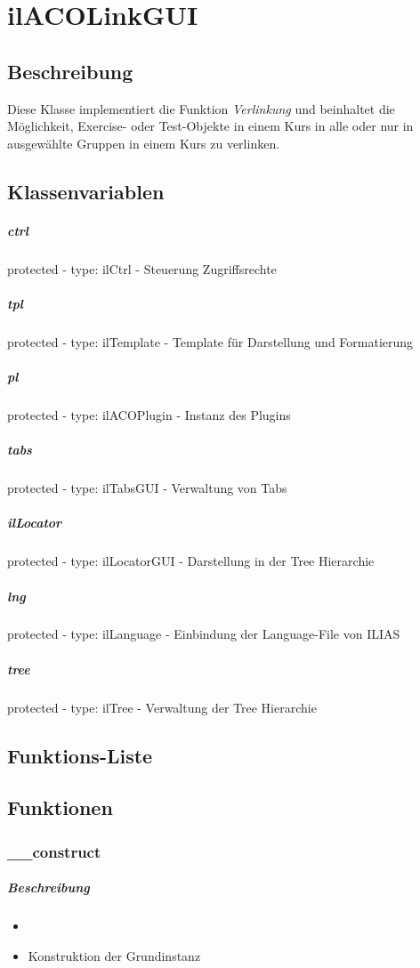 \section{ilACOLinkGUI}

\subsection*{Beschreibung}
Diese Klasse implementiert die Funktion \textit{Verlinkung} und beinhaltet die Möglichkeit, Exercise- oder Test-Objekte in einem Kurs in alle oder nur in ausgewählte Gruppen in einem Kurs zu verlinken.

\subsection*{Klassenvariablen}
\subparagraph{ctrl}
protected - type: ilCtrl - Steuerung Zugriffsrechte
\subparagraph{tpl}
protected - type: ilTemplate - Template für Darstellung und Formatierung
\subparagraph{pl}
protected - type: ilACOPlugin - Instanz des Plugins
\subparagraph{tabs}
protected - type: ilTabsGUI - Verwaltung von Tabs
\subparagraph{ilLocator}
protected - type: ilLocatorGUI - Darstellung in der Tree Hierarchie
\subparagraph{lng}
protected - type: ilLanguage - Einbindung der Language-File von ILIAS
\subparagraph{tree}
protected - type: ilTree - Verwaltung der Tree Hierarchie

\subsection*{Funktions-Liste}
\subparagraph{}
\subparagraph{}
\subparagraph{}
\subparagraph{}
\subparagraph{}
\subparagraph{}
\subparagraph{}
\subparagraph{}
\subparagraph{}
\subparagraph{}
\subparagraph{}
\subparagraph{}
\subparagraph{}
\subparagraph{}
\subparagraph{}

\subsection*{Funktionen}
\subsubsection*{\_\_construct}\label{constructLGUI}
\subparagraph{Beschreibung}
\begin{itemize}
	\item[] \noindent{} 
	\item[] Konstruktion der Grundinstanz
\end{itemize}

